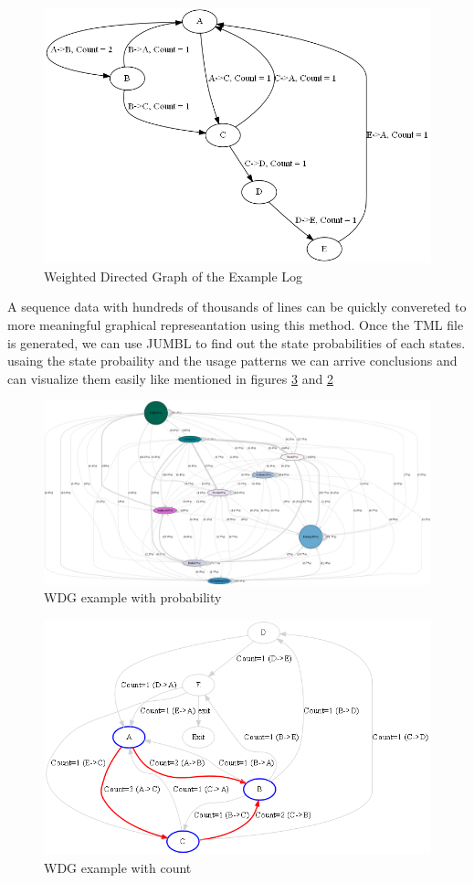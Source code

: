 \begin{figure}
  \centering
  \includegraphics[scale=.40]{../Graphics/op-profile-example.png}
  \caption{Weighted Directed Graph of the Example Log}\label{op-profile-example}
\end{figure}


A sequence data with hundreds of thousands of lines can be quickly convereted to more meaningful graphical represeantation using this method. Once the TML file is generated, we can use JUMBL to find out the state probabilities of each states. usaing the state probaility and the usage patterns we can arrive conclusions and can visualize them easily like mentioned in figures  \ref{fig:sample_log} and \ref{fig:log_with_color}

\begin{figure}
  \centering
  \includegraphics[scale=.15]{../Graphics/log_with_color.png}
  \caption{WDG example with probability}\label{fig:log_with_color}
\end{figure}

\begin{figure}
  \centering
  \includegraphics[scale=.50]{../Graphics/sample_log.png}
  \caption{WDG example with count}\label{fig:sample_log}
\end{figure}

 


